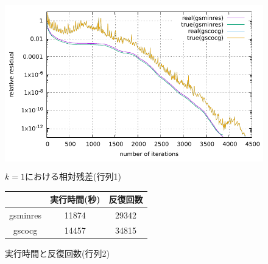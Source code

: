 

\begin{figure}[H]
	\begin{center}
		\begin{minipage}[]{0.49\columnwidth}
			\centering
			\colorbox{white}{ \includegraphics[scale=1.5]{./fig/compare-residual_PPE3594.pdf} }
			\caption{$k=1$における相対残差(行列1)}
			\label{fig-compare-residual}
		\end{minipage}
		\begin{minipage}[]{0.49\columnwidth}
			\centering
			\makeatletter
			\def\@captype{table}
			\makeatother
			\caption{実行時間と反復回数(行列2)}
			\label{table-compare-time-itrs}
			\begin{tabular}{ccc}
				\hline
						& 実行時間(秒)	& 反復回数	\\ \hline
				gsminres	& 11874		& 29342	\\
				gscocg	& 14457		& 34815	\\
				\hline
			\end{tabular}
		\end{minipage}
	\end{center}
\end{figure}
\vspace{2pt}
